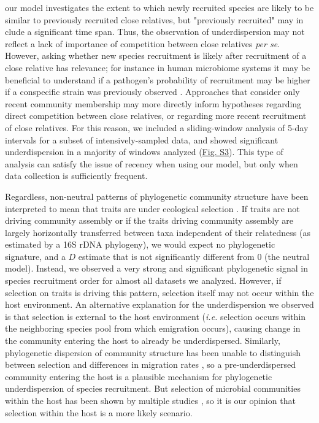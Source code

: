 \documentclass{article}
\begin{document}
our model investigates the extent to which newly recruited species are likely to be similar to previously recruited close relatives, but "previously recruited" may in clude a significant time span. Thus, the observation of underdispersion may not reflect a lack of importance of competition between close relatives \emph{per se}. However, asking whether new species recruitment is likely after recruitment of a close relative has relevance; for instance in human microbiome systems it may be beneficial to understand if a pathogen's probability of recruitment may be higher if a conspecific strain was previously observed \cite{Li2016,Stecher2010}. Approaches that consider only recent community membership may more directly inform hypotheses regarding direct competition between close relatives, or regarding more recent recruitment of close relatives. For this reason, we included a sliding-window analysis of 5-day intervals for a subset of intensively-sampled data, and showed significant underdispersion in a majority of windows analyzed (\hyperref[sec:figureS3]{Fig. S3}). This type of analysis can satisfy the issue of recency when using our model, but only when data collection is sufficiently frequent.
\par
Regardless, non-neutral patterns of phylogenetic community structure have been interpreted to mean that traits are under ecological selection \cite{Webb2000,Webb2002,CavenderBares2004,Gerhold2015}. If traits are not driving community assembly \cite{Hubbell2001} or if the traits driving community assembly are largely horizontally transferred between taxa independent of their relatedness (as estimated by a 16S rDNA phylogeny), we would expect no phylogenetic signature, and a \(D\) estimate that is not significantly different from 0 (the neutral model). Instead, we observed a very strong and significant phylogenetic signal in species recruitment order for almost all datasets we analyzed. However, if selection on traits is driving this pattern, selection itself may not occur within the host environment. An alternative explanation for the underdispersion we observed is that selection is external to the host environment (\emph{i.e.} selection occurs within the neighboring species pool from which emigration occurs), causing change in the community entering the host to already be underdispersed. Similarly, phylogenetic dispersion of community structure has been unable to distinguish between selection and differences in migration rates \cite{Emerson2008}, so a pre-underdispersed community entering the host is a plausible mechanism for phylogenetic underdispersion of species recruitment. But selection of microbial communities within the host has been shown by multiple studies \cite{Peterfreund2012,David2014,Kennedy2016}, so it is our opinion that selection within the host is a more likely scenario.
\end{document}
